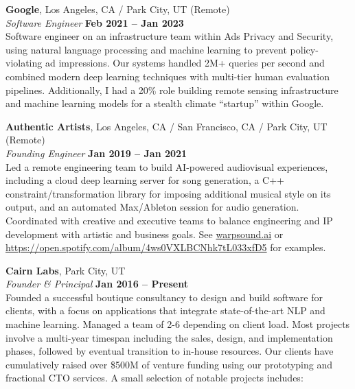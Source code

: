 \documentclass[margin,line]{resume}
\begin{document}
\begin{resume}
    \textbf{Google}, Los Angeles, CA / Park City, UT (Remote)  \vspace{2mm}\\\vspace{1mm}%
    \textsl{Software Engineer} \hfill \textbf{Feb 2021 -- Jan 2023}\\
    Software engineer on an infrastructure team within Ads Privacy and Security,
    using natural language processing and machine learning to prevent
    policy-violating ad impressions. Our systems handled 2M+ queries per second
    and combined modern deep learning techniques with multi-tier human
    evaluation pipelines. Additionally, I had a 20\% role building
    remote sensing infrastructure and machine learning models for a stealth
    climate ``startup'' within Google.

    \textbf{Authentic Artists}, Los Angeles, CA / San Francisco, CA / Park City, UT (Remote) \vspace{2mm}\\\vspace{1mm}%
    \textsl{Founding Engineer} \hfill \textbf{Jan 2019 -- Jan 2021}\\
    Led a remote engineering team to build AI-powered audiovisual
    experiences, including a cloud deep learning server for song generation, a
    C++ constraint/transformation library for imposing additional musical style
    on its output, and an automated Max/Ableton session for audio generation.
    Coordinated with creative and executive teams to balance engineering and IP
    development with artistic and business goals. See \url{warpsound.ai} or
    \url{https://open.spotify.com/album/4ws0VXLBCNhk7tL033xfD5} for examples.

    \textbf{Cairn Labs}, Park City, UT \vspace{2mm}\\\vspace{1mm}%
    \textsl{Founder \& Principal} \hfill \textbf{Jan 2016 -- Present}\\
    Founded a successful boutique consultancy to design and build software
    for clients, with a focus on applications that integrate state-of-the-art
    NLP and machine learning. Managed a team of 2-6 depending on client load.
    Most projects involve a multi-year timespan including the sales, design, and
    implementation phases, followed by eventual transition to in-house
    resources. Our clients have cumulatively raised over \$500M of venture
    funding using our prototyping and fractional CTO services. A small selection
    of notable projects includes:


\end{resume}
\end{document}
